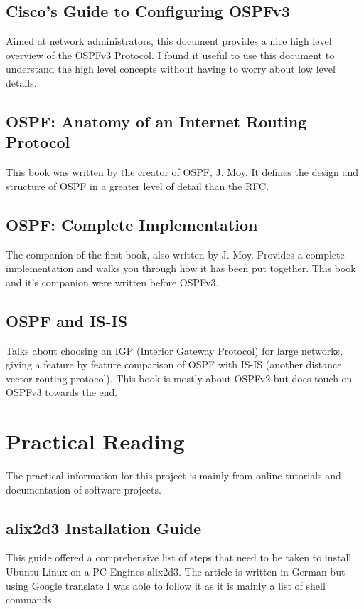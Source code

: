 \documentclass[12pt]{report}
\begin{document}
\subsection{Cisco's Guide to Configuring OSPFv3}
Aimed at network administrators, this document provides a nice high level
overview of the OSPFv3 Protocol. I found it useful to use this document to
understand the high level concepts without having to worry about low level
details.

\subsection{OSPF: Anatomy of an Internet Routing Protocol}
This book was written by the creator of OSPF, J. Moy. It defines the design and
structure of OSPF in a greater level of detail than the RFC.

\subsection{OSPF: Complete Implementation}
The companion of the first book, also written by J. Moy. Provides a complete
implementation and walks you through how it has been put together. This book and
it's companion were written before OSPFv3.

\subsection{OSPF and IS-IS}
Talks about choosing an IGP (Interior Gateway Protocol) for large networks,
giving a feature by feature comparison of OSPF with IS-IS (another distance
vector routing protocol). This book is mostly about OSPFv2 but does touch on
OSPFv3 towards the end.

\section{Practical Reading}		
The practical information for this project is mainly from online tutorials and
documentation of software projects.  

\subsection{alix2d3 Installation Guide}
This guide offered a comprehensive list of steps that need to be taken to
install Ubuntu Linux on a PC Engines alix2d3.  The article is written in
German but using Google translate I was able to follow it as it is mainly a list
of shell commands.
\end{document}
